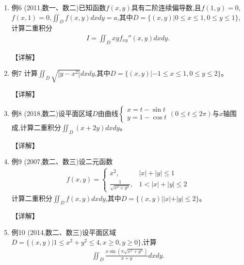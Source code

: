 \documentclass[12pt, a4paper, oneside, UTF8]{ctexbook}
\begin{document}
\begin{enumerate}[label=\arabic*.,start=6]
    \item 例6 (2011,数一、数二)已知函数$f(x,y)$具有二阶连续偏导数,且$f(1,y)=0$,$f(x,1)=0$,$\iint_D f(x,y)dxdy=a$,其中$D=\{(x,y)|0\leq x\leq 1,0\leq y\leq 1\}$,计算二重积分
    \begin{align*}
        I=\iint_D xyf_{xy}''(x,y)dxdy.
    \end{align*}
    
    \begin{solution}
    【详解】
    \end{solution}
    
    \item 例7 计算$\iint_D\sqrt{|y-x^2|}dxdy$,其中$D=\{(x,y)|-1\leq x\leq 1,0\leq y\leq 2\}$。
    
    \begin{solution}
    【详解】
    \end{solution}
    
    \item 例8 (2018,数二)设平面区域$D$由曲线$\begin{cases}x=t-\sin t \\ y=1-\cos t\end{cases}(0\leq t\leq 2\pi)$与$x$轴围成,计算二重积分$\iint_D(x+2y)dxdy$。
    
    \begin{solution}
    【详解】
    \end{solution}
    
    \item 例9 (2007,数二、数三)设二元函数
    \begin{align*}
        f(x,y)=\begin{cases}
            x^2, & |x|+|y|\leq 1 \\
            \frac{1}{\sqrt{x^2+y^2}}, & 1<|x|+|y|\leq 2
        \end{cases}
    \end{align*}
    计算二重积分$\iint_D f(x,y)dxdy$,其中$D=\{(x,y)||x|+|y|\leq 2\}$。
    
    \begin{solution}
    【详解】
    \end{solution}
    
    \item 例10 (2014,数二、数三)设平面区域$D=\{(x,y)|1\leq x^2+y^2\leq 4,x\geq 0,y\geq 0\}$,计算
    \begin{align*}
        \iint_D\frac{x\sin(\pi\sqrt{x^2+y^2})}{x+y}dxdy.
    \end{align*}
    

\end{enumerate}
\end{document}
